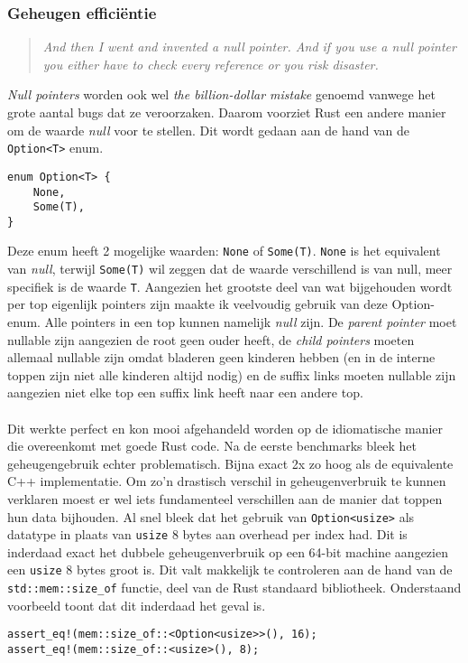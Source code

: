 \subsubsection{Geheugen efficiëntie}
\begin{quote}
    \textit{And then I went and invented a null pointer.
    And if you use a null pointer you either have to check every reference or you risk disaster. \cite{null_mistake}}
\end{quote}
\textit{Null pointers} worden ook wel \textit{the billion-dollar mistake} genoemd vanwege het grote aantal bugs dat ze veroorzaken.
Daarom voorziet Rust een andere manier om de waarde \textit{null} voor te stellen.
Dit wordt gedaan aan de hand van de \texttt{Option<T>} enum.

\begin{verbatim}
enum Option<T> {
    None,
    Some(T),
}
\end{verbatim}

Deze enum heeft 2 mogelijke waarden: \texttt{None} of \texttt{Some(T)}.
\texttt{None} is het equivalent van \textit{null}, terwijl \texttt{Some(T)} wil zeggen dat de waarde verschillend is van null, meer specifiek is de waarde \texttt{T}.
Aangezien het grootste deel van wat bijgehouden wordt per top eigenlijk pointers zijn maakte ik veelvoudig gebruik van deze Option-enum.
Alle pointers in een top kunnen namelijk \textit{null} zijn.
De \textit{parent pointer} moet nullable zijn aangezien de root geen ouder heeft, de \textit{child pointers} moeten allemaal nullable zijn omdat bladeren geen kinderen hebben (en in de interne toppen zijn niet alle kinderen altijd nodig) en de suffix links moeten nullable zijn aangezien niet elke top een suffix link heeft naar een andere top.
\\ \\
Dit werkte perfect en kon mooi afgehandeld worden op de idiomatische manier die overeenkomt met goede Rust code.
Na de eerste benchmarks bleek het geheugengebruik echter problematisch.
Bijna exact 2x zo hoog als de equivalente C++ implementatie.
Om zo'n drastisch verschil in geheugenverbruik te kunnen verklaren moest er wel iets fundamenteel verschillen aan de manier dat toppen hun data bijhouden.
Al snel bleek dat het gebruik van \texttt{Option<usize>} als datatype in plaats van \texttt{usize} 8 bytes aan overhead per index had.
Dit is inderdaad exact het dubbele geheugenverbruik op een 64-bit machine aangezien een \texttt{usize} 8 bytes groot is.
Dit valt makkelijk te controleren aan de hand van de \texttt{std::mem::size\_of} functie, deel van de Rust standaard bibliotheek.
Onderstaand voorbeeld toont dat dit inderdaad het geval is.
\begin{verbatim}
assert_eq!(mem::size_of::<Option<usize>>(), 16);
assert_eq!(mem::size_of::<usize>(), 8);
\end{verbatim}

